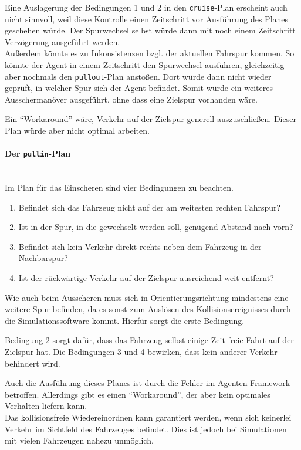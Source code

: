 Eine Auslagerung der Bedingungen 1 und 2 in den \texttt{cruise}-Plan erscheint auch nicht sinnvoll, weil diese Kontrolle einen Zeitschritt vor Ausführung des Planes geschehen würde.
Der Spurwechsel selbst würde dann mit noch einem Zeitschritt Verzögerung ausgeführt werden.
\\
Außerdem könnte es zu Inkonsistenzen bzgl. der aktuellen Fahrspur kommen.
So könnte der Agent in einem Zeitschritt den Spurwechsel ausführen, gleichzeitig aber nochmals den \texttt{pullout}-Plan anstoßen.
Dort würde dann nicht wieder geprüft, in welcher Spur sich der Agent befindet.
Somit würde ein weiteres Ausschermanöver ausgeführt, ohne dass eine Zielspur vorhanden wäre.

Ein \enquote{Workaround} wäre, Verkehr auf der Zielspur generell auszuschließen.
Dieser Plan würde aber nicht optimal arbeiten. 



\paragraph*{Der \texttt{pullin}-Plan}
\hfill \\
Im Plan für das Einscheren sind vier Bedingungen zu beachten.

\begin{enumerate}
	\itemsep0em
	\item Befindet sich das Fahrzeug nicht auf der am weitesten rechten Fahrspur?
	\item Ist in der Spur, in die gewechselt werden soll, genügend Abstand nach vorn?
	\item Befindet sich kein Verkehr direkt rechts neben dem Fahrzeug in der Nachbarspur?
	\item Ist der rückwärtige Verkehr auf der Zielspur ausreichend weit entfernt?
\end{enumerate}

Wie auch beim Ausscheren muss sich in Orientierungsrichtung mindestens eine weitere Spur befinden, da es sonst zum Auslösen des Kollisionsereignisses durch die Simulationssoftware kommt.
Hierfür sorgt die erste Bedingung.

Bedingung 2 sorgt dafür, dass das Fahrzeug selbst einige Zeit freie Fahrt auf der Zielspur hat.
Die Bedingungen 3 und 4 bewirken, dass kein anderer Verkehr behindert wird. 

Auch die Ausführung dieses Planes ist durch die Fehler im Agenten-Framework betroffen. Allerdings gibt es einen \enquote{Workaround}, der aber kein optimales Verhalten liefern kann.
\\
Das kollisionsfreie Wiedereinordnen kann garantiert werden, wenn sich keinerlei Verkehr im Sichtfeld des Fahrzeuges befindet.
Dies ist jedoch bei Simulationen mit vielen Fahrzeugen nahezu unmöglich.



